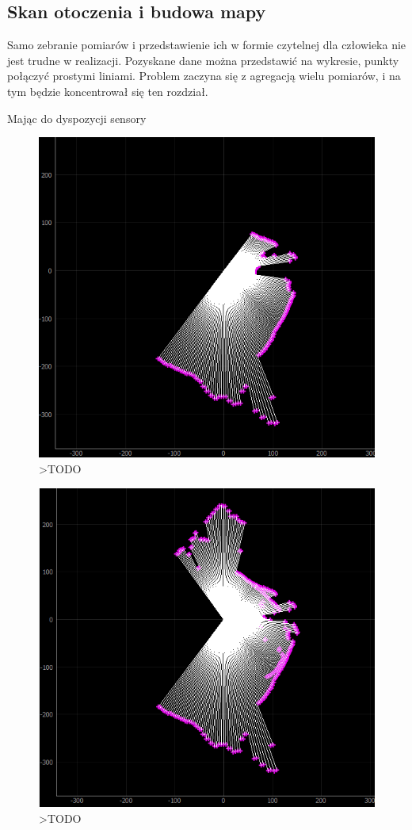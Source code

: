 \subsection{Skan otoczenia i budowa mapy}
Samo zebranie pomiarów i przedstawienie ich w formie czytelnej dla człowieka nie jest trudne w realizacji. Pozyskane dane można przedstawić na wykresie, punkty połączyć prostymi liniami. Problem zaczyna się z agregacją wielu pomiarów, i na tym będzie koncentrował się ten rozdział.

Mając do dyspozycji sensory




\begin{figure}[ht]
	\centering
		\includegraphics[width=0.5\linewidth]{rys/ScanBot-12-calibrated-room-map1.PNG}
	\caption{>TODO}
	\label{fig:xxx}
\end{figure}

\begin{figure}[ht]
	\centering
		\includegraphics[width=0.5\linewidth]{rys/ScanBot-12-calibrated-room-map2.PNG}
	\caption{>TODO}
	\label{fig:xxx}
\end{figure}

